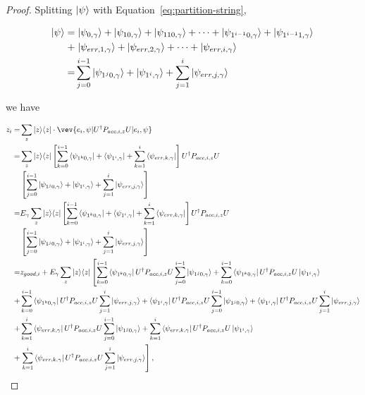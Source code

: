 \begin{proof}
Splitting $\ket{\psi}$ with Equation~\ref{eq:partition-string}, 

\begin{align}
    \ket{\psi}=& \left. \ket{\psi_{0,\gamma}}+\ket{\psi_{10,\gamma}}+\ket{\psi_{110,\gamma}}+\cdots+\ket{\psi_{1^{i-1}0,\gamma}}+
    \ket{\psi_{1^{i-1}1,\gamma}} \right. \nonumber \\
     +& \left.\ket{\psi_{err,1,\gamma}}+\ket{\psi_{err,2,\gamma}}+\cdots+\ket{\psi_{err,i,\gamma}}\right. \nonumber \\
     =& \sum_{j=0}^{i-1} \ket{\psi_{1^j0,\gamma}} +\ket{\psi_{1^i,\gamma}} +\sum_{j=1}^{i}\ket{\psi_{err,j,\gamma}}
\end{align}


we have 

\begin{align}
    z_i =& \sum_z \proj{z} \cdot \vev{e_i,\psi|U^\dag P_{acc,i,z} U|e_i,\psi} \nn \\
    =& \sum_z \proj{z} \L[\sum_{k=0}^{i-1} \bra{\psi_{1^k0,\gamma}} +\bra{\psi_{1^i,\gamma}} +\sum_{k=1}^{i}\bra{\psi_{err,k,\gamma}} \R]U^\dag  P_{acc,i,z} U\nn \\
    &\L[ \sum_{j=0}^{i-1} \ket{\psi_{1^j0,\gamma}} +\ket{\psi_{1^i,\gamma}} +\sum_{j=1}^{i}\ket{\psi_{err,j,\gamma}}\R]  \nn \\
    =& E_\gamma \sum_z \proj{z} \L[\sum_{k=0}^{i-1} \bra{\psi_{1^k0,\gamma}} +\bra{\psi_{1^i,\gamma}} +\sum_{k=1}^{i}\bra{\psi_{err,k,\gamma}} \R]U^\dag  P_{acc,i,z} U\nn \\
    &\L[ \sum_{j=0}^{i-1} \ket{\psi_{1^j0,\gamma}} +\ket{\psi_{1^i,\gamma}} +\sum_{j=1}^{i}\ket{\psi_{err,j,\gamma}}\R]  \nn \\
    =& z_{good,i}+ E_\gamma \sum_z \proj{z} \L[\sum_{k=0}^{i-1} \bra{\psi_{1^k0,\gamma}}U^\dag  P_{acc,i,z}U   \sum_{j=0}^{i-1} \ket{\psi_{1^j0,\gamma}}+
    \sum_{k=0}^{i-1} \bra{\psi_{1^k0,\gamma}}U^\dag  P_{acc,i,z}U \ket{\psi_{1^i,\gamma}}  \R. \nn \\
      +&  \sum_{k=0}^{i-1} \bra{\psi_{1^k0,\gamma}}U^\dag  P_{acc,i,z}U\sum_{j=1}^{i}\ket{\psi_{err,j,\gamma}}
    +\bra{\psi_{1^i,\gamma}} U^\dag  P_{acc,i,z}U \sum_{j=0}^{i-1} \ket{\psi_{1^j0,\gamma}}
    +\bra{\psi_{1^i,\gamma}} U^\dag  P_{acc,i,z}U \sum_{j=1}^{i}\ket{\psi_{err,j,\gamma}} \nn \\
    +& \sum_{k=1}^{i}\bra{\psi_{err,k,\gamma}} U^\dag  P_{acc,i,z}U  \sum_{j=0}^{i-1} \ket{\psi_{1^j0,\gamma}} 
    +\sum_{k=1}^{i}\bra{\psi_{err,k,\gamma}} U^\dag  P_{acc,i,z}U \ket{\psi_{1^i,\gamma}} \nn \\
    +&\L.\sum_{k=1}^{i}\bra{\psi_{err,k,\gamma}} U^\dag  P_{acc,i,z}U \sum_{j=1}^{i}\ket{\psi_{err,j,\gamma}} \R] , \nn     
\end{align}


\end{proof}
